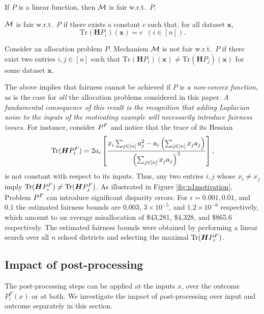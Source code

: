 \begin{corollary}
	\label{cor:2}
	If $P$ is a linear function, then $\mathcal{M}$ is fair w.r.t.~$P$.
\end{corollary}


\begin{corollary}
	\label{cor:3}
	$\mathcal{M}$ is fair w.r.t.~$P$ if there exists a constant $c$ such that,
	for all dataset $\bm{x}$,
	\[
		\mbox{Tr}(\bm{H}P_i)(\bm{x}) = c \;\; (i \in [n]).
	\]
\end{corollary}

\begin{corollary}
	Consider an allocation problem $P$. Mechanism $\mathcal{M}$ is not fair
	w.r.t.~$P$ if there exist two entries $i, j \in [n]$ such that
	$\mbox{Tr}(\bm{H}P_i)(\bm{x}) \neq \mbox{Tr}(\bm{H}P_j)(\bm{x})$ for some dataset
	$\bm{x}$.
\end{corollary}

\noindent
The above implies that fairness cannot be achieved if $P$ is \emph{a
non-convex function}, as is the case for \emph{all} the allocation
problems considered in this paper. {\em A fundamental consequence of
this result is the recognition that adding Laplacian noise to the
inputs of the motivating example will necessarily introduce fairness
issues.} For instance, consider $P^F$ and notice that the trace of
its Hessian
\[
	\mbox{Tr}(\bm{H}P^F_i) = 2a_i \left[
		\frac{x_i \sum_{j\in[n]} a_j^2 - a_i \left(\sum_{j\in[n]} x_ja_j\right)}
		{\left(\sum_{j\in[n]}x_ja_j\right)^3}
		\right],
\]
is not constant with respect to its inputs. Thus, any two entries $i,
j$ whose $x_i \neq x_j$ imply $\mbox{Tr}(\bm{H}P^F_i) \neq
\mbox{Tr}(\bm{H}P^F_j)$. As illustrated in Figure \ref{fig:p1motivation},
Problem $P^F$ can introduce significant disparity errors. For $\epsilon = 0.001,
0.01$, and $0.1$ the estimated fairness bounds are $0.003$, $3\times
10^{-5}$, and $1.2\times 10^{-6}$ respectively, which amount to an
average misallocation of \$43,281, \$4,328, and \$865.6 respectively.
The estimated fairness bounds were obtained by performing a linear
search over all $n$ school districts and selecting the maximal
$\mbox{Tr}(\bm{H}P^F_i)$.


\subsection*{Impact of post-processing}
The post-processing steps can be applied at the inputs $x$, over the outcome $P^F_{i}(x)$ or at both. We investigate the impact of post-processing over input and outcome separately in this section.


